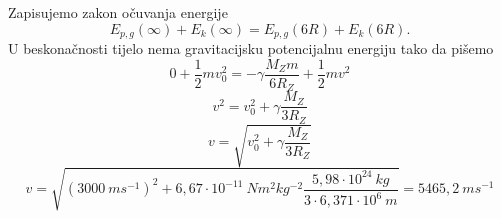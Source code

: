 
Zapisujemo zakon očuvanja energije
$$  E_{p,g}(\infty) +  E_k(\infty) = E_{p,g}(6R) +  E_k(6R). $$
U beskonačnosti tijelo nema gravitacijsku potencijalnu energiju tako da pišemo
$$ 0 + \frac{1}{2}mv_0^2 = -\gamma \frac{M_Zm}{6R_Z} + \frac{1}{2}mv^2$$
$$ v^2= v_0^2 + \gamma \frac{M_Z}{3R_Z}$$
$$ v = \sqrt{v_0^2 + \gamma \frac{M_Z}{3R_Z}}$$
$$ v = \sqrt{(3000\ ms^{-1})^2  + 6,67\cdot  10^{−11}\ Nm^2kg^{−2} 
\frac{5,98 \cdot  10^{24}\ kg}{3\cdot 6,371 \cdot 10^6\ m}}=5465,2\ ms^{-1} $$
